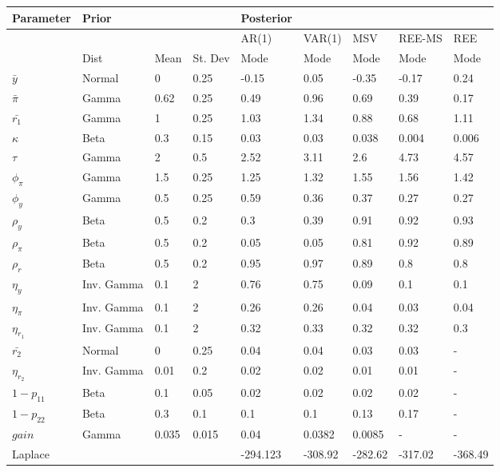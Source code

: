 \documentclass[12pt,reqno]{article}
\numberwithin{equation}{section}
\begin{document}
\begin{table}[H]
\begin{tabular}{l||lll||l|l|l|ll}
Parameter & Prior &  &  & Posterior &  &  &  &  \\
\hline
\hline
 &  &  &  & AR(1) & VAR(1) & MSV & REE-MS & REE \\
\hline
\hline
 & Dist & Mean & St. Dev & Mode & Mode & Mode & Mode & Mode  \\
$\bar{y}$ & Normal & 0 & 0.25 & -0.15 & 0.05 & -0.35 & -0.17 & 0.24 \\
$\bar{\pi}$ & Gamma & 0.62 & 0.25 & 0.49 & 0.96 & 0.69 & 0.39 & 0.17 \\
$\bar{r_1}$ & Gamma & 1 & 0.25 & 1.03 & 1.34 & 0.88 & 0.68 & 1.11 \\
$\kappa$ & Beta & 0.3 & 0.15 & 0.03 & 0.03 & 0.038 & 0.004 & 0.006 \\
$\tau$ & Gamma & 2 & 0.5 & 2.52 & 3.11 & 2.6 & 4.73 & 4.57 \\
$\phi_{\pi}$ & Gamma & 1.5 & 0.25 & 1.25 & 1.32 & 1.55 & 1.56 & 1.42 \\
$\phi_y$ & Gamma & 0.5 & 0.25 & 0.59 & 0.36 & 0.37 & 0.27 & 0.27 \\
$\rho_y$ & Beta & 0.5 & 0.2 & 0.3 & 0.39 & 0.91 & 0.92 & 0.93 \\
$\rho_{\pi}$ & Beta & 0.5 & 0.2 & 0.05 & 0.05 & 0.81 & 0.92 & 0.89 \\
$\rho_r$ & Beta & 0.5 & 0.2 & 0.95 & 0.97 & 0.89 & 0.8 & 0.8 \\
$\eta_y$ & Inv. Gamma & 0.1 & 2 & 0.76 & 0.75 & 0.09 & 0.1 & 0.1 \\
$\eta_{\pi}$ & Inv. Gamma & 0.1 & 2 & 0.26 & 0.26 & 0.04 & 0.03 & 0.04 \\
$\eta_{r_1}$ & Inv. Gamma & 0.1 & 2 & 0.32 & 0.33 & 0.32 & 0.32 & 0.3 \\
$\bar{r_2}$ & Normal & 0 & 0.25 & 0.04 & 0.04 & 0.03 & 0.03 & - \\
$\eta_{r_2}$ & Inv. Gamma & 0.01 & 0.2 & 0.02 & 0.02 & 0.01 & 0.01 & - \\
$1-p_{11}$ & Beta & 0.1 & 0.05 & 0.02 & 0.02 & 0.02 & 0.02 & - \\
$1-p_{22}$ & Beta & 0.3 & 0.1 & 0.1 & 0.1 & 0.13 & 0.17 & - \\
$gain$ & Gamma & 0.035 & 0.015 & 0.04 & 0.0382 & 0.0085 & - & - \\
\hline
\hline
Laplace &  &  &  & -294.123 & -308.92 & -282.62 & -317.02 & -368.49
\end{tabular}
\end{table}
\end{document}
